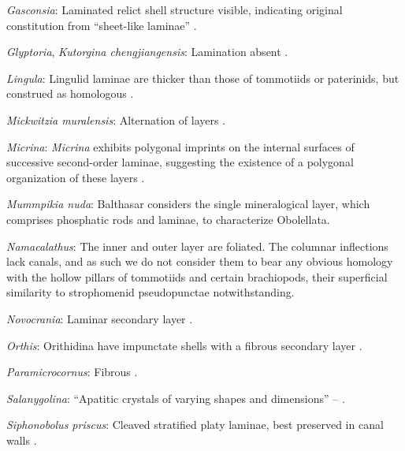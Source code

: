 \documentclass[openany]{book}
\theoremstyle{definition}
\theoremstyle{definition}
\theoremstyle{definition}
\theoremstyle{remark}
\begin{document}
\hypertarget{Gasconsia-coding-127}{}
\emph{Gasconsia}: Laminated relict shell structure visible, indicating
original constitution from ``sheet-like laminae''
\citep{Hanken1985Thetaxonomy}.

\hypertarget{Glyptoria-coding-127}{}
\emph{Glyptoria}, \emph{Kutorgina chengjiangensis}: Lamination absent
\citep[following][appendix 2]{Williams1998Thediversity}.

\hypertarget{Lingula-coding-127}{}
\emph{Lingula}: Lingulid laminae are thicker than those of tommotiids or
paterinids, but construed as homologous
\citep{Balthasar2009Homologousskeletal}.

\hypertarget{Mickwitzia_muralensis-coding-127}{}
\emph{Mickwitzia muralensis}: Alternation of layers
\citep{Balthasar2004Shellstructure}.

\hypertarget{Micrina-coding-127}{}
\emph{Micrina}: \emph{Micrina} exhibits polygonal imprints on the
internal surfaces of successive second-order laminae, suggesting the
existence of a polygonal organization of these layers
\citep{Balthasar2009Homologousskeletal}.

\hypertarget{Mummpikia_nuda-coding-127}{}
\emph{Mummpikia nuda}: Balthasar \citeyearpar{Balthasar2008iMummpikia}
considers the single mineralogical layer, which comprises phosphatic
rods and laminae, to characterize Obolellata.

\hypertarget{Namacalathus-coding-127}{}
\emph{Namacalathus}: The inner and outer layer are foliated. The
columnar inflections lack canals, and as such we do not consider them to
bear any obvious homology with the hollow pillars of tommotiids and
certain brachiopods, their superficial similarity to strophomenid
pseudopunctae notwithstanding.

\hypertarget{Novocrania-coding-127}{}
\emph{Novocrania}: Laminar secondary layer \citep{Parkinson2005}.

\hypertarget{Orthis-coding-127}{}
\emph{Orthis}: Orithidina have impunctate shells with a fibrous
secondary layer \citep[p.~724]{Williams2000LinguliformeaCraniiformea}.

\hypertarget{Paramicrocornus-coding-127}{}
\emph{Paramicrocornus}: Fibrous \citep{Zhang2018Ahyolithid}.

\hypertarget{Salanygolina-coding-127}{}
\emph{Salanygolina}: ``Apatitic crystals of varying shapes and
dimensions'' -- \citet{Holmer2009Theenigmatic}.

\hypertarget{Siphonobolus_priscus-coding-127}{}
\emph{Siphonobolus priscus}: Cleaved stratified platy laminae, best
preserved in canal walls \citep{Williams2004Chemicostructure}.
\end{document}
